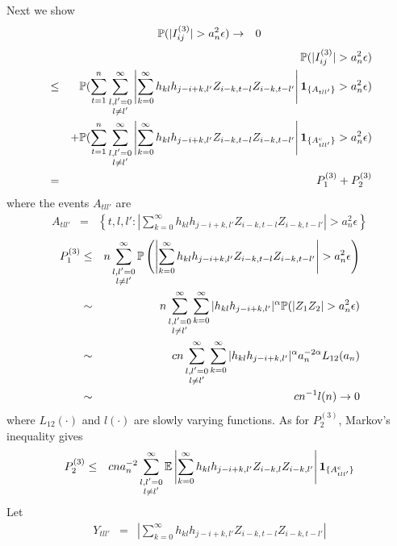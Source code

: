 \documentclass{article}
\begin{document}
Next we show
\begin{eqnarray*}
  \mathbb{P}(|I^{(3)}_{ij}| > a_n^2 \epsilon) &\to& 0
\end{eqnarray*}
\begin{eqnarray*}
  && \mathbb{P}(|I^{(3)}_{ij}| > a_n^2 \epsilon) \\
  &\leq& \mathbb{P}(\sum_{t=1}^n \sum_{\substack{l,l'=0 \\ l \neq l'}}^\infty
  \left|\sum_{k=0}^\infty h_{kl}h_{j-i+k,l'} Z_{i-k,t-l}Z_{i-k,t-l'}\right|
  \mathbf{1}_{\{A_{tll'}\}} > a_n^2 \epsilon ) \\
  && + \mathbb{P}(\sum_{t=1}^n \sum_{\substack{l,l'=0 \\ l \neq l'}}^\infty
  \left|\sum_{k=0}^\infty h_{kl}h_{j-i+k,l'} Z_{i-k,t-l}Z_{i-k,t-l'}\right|
  \mathbf{1}_{\{A^c_{tll'}\}} > a_n^2 \epsilon ) \\
  &=& P^{(3)}_1 + P^{(3)}_2
\end{eqnarray*}
where the events $A_{tll'}$ are
\begin{eqnarray*}
  A_{tll'} &=& \left\{t,l,l': \left|
      \sum_{k=0}^\infty h_{kl}h_{j-i+k,l'} Z_{i-k,t-l}Z_{i-k,t-l'}
    \right| > a_n^2 \epsilon \right\}
\end{eqnarray*}
\begin{eqnarray*}
  P^{(3)}_1 &\leq& n \sum_{\substack{l,l'=0 \\ l \neq l'}}^\infty \mathbb{P}\left(
    \left|\sum_{k=0}^\infty h_{kl}h_{j-i+k,l'} Z_{i-k,t-l}Z_{i-k,t-l'}\right| > a_n^2 \epsilon
  \right) \\
  &\sim& n \sum_{\substack{l,l'=0 \\ l \neq l'}}^\infty \sum_{k=0}^\infty |h_{kl}h_{j-i+k,l'}|^{\alpha} \mathbb{P}(|Z_1 Z_2| > a_n^2 \epsilon)
  \\
  &\sim& c n \sum_{\substack{l,l'=0 \\ l \neq l'}}^\infty
  \sum_{k=0}^\infty |h_{kl}h_{j-i+k,l'}|^{\alpha} a_n^{-2\alpha} L_{12}(a_n)\\  
  &\sim& c n^{-1} l(n)  \to 0
\end{eqnarray*}
where $L_{12}(\cdot)$ and $l(\cdot)$ are slowly varying functions. As
for $P^{(3)}_2$, Markov's inequality gives
\begin{eqnarray*}
  P^{(3)}_2 &\leq& c n a_n^{-2} \sum_{\substack{l,l'=0 \\ l \neq l'}}^\infty
  \mathbb{E}\left|\sum_{k=0}^\infty h_{kl}h_{j-i+k,l'}
    Z_{i-k,l}Z_{i-k,l'}\right| \mathbf{1}_{\{A^c_{tll'}\}} \\
\end{eqnarray*}
Let
\begin{eqnarray*}
  Y_{tll'} &=& \left|\sum_{k=0}^\infty h_{kl}h_{j-i+k,l'}
              Z_{i-k,t-l}Z_{i-k,t-l'}\right|
\end{eqnarray*}
\end{document}
